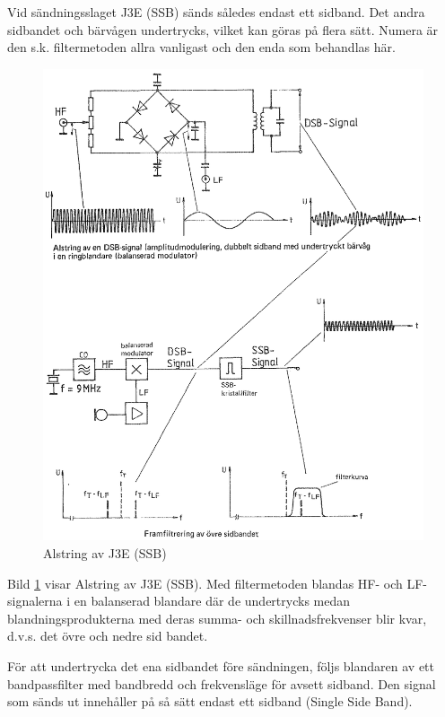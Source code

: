 Vid sändningsslaget J3E (SSB) sänds således endast ett sidband.
Det andra sidbandet och bärvågen undertrycks, vilket kan göras på flera sätt.
Numera är den s.k. filtermetoden allra vanligast och den enda som behandlas här.

\begin{figure}
\includegraphics[width=\textwidth]{images/cropped_pdfs/bild_2_3-90.pdf}
\caption{Alstring av J3E (SSB)}
\label{fig:BildII3-90}
\end{figure}

Bild \ref{fig:BildII3-90} visar Alstring av J3E (SSB).
Med filtermetoden blandas HF- och LF-signalerna i en balanserad blandare där de
undertrycks medan blandningsprodukterna med deras summa- och
skillnadsfrekvenser blir kvar, d.v.s. det övre och nedre sid bandet.

För att undertrycka det ena sidbandet före sändningen, följs blandaren
av ett bandpassfilter med bandbredd och frekvensläge för avsett sidband.
Den signal som sänds ut innehåller på så sätt endast ett sidband (Single Side
Band).

